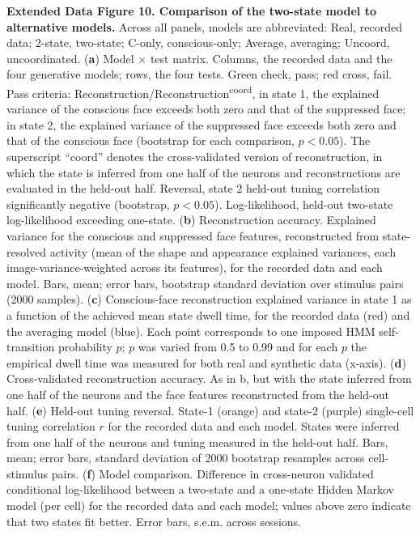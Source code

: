 \documentclass{article}
\begin{document}
\noindent\textbf{Extended Data Figure 10. Comparison of the two-state model to alternative models.} Across all panels, models are abbreviated: Real, recorded data; 2-state, two-state; C-only, conscious-only; Average, averaging; Uncoord, uncoordinated. (\textbf{a}) Model $\times$ test matrix. Columns, the recorded data and the four generative models; rows, the four tests. Green check, pass; red cross, fail. Pass criteria: Reconstruction/\allowbreak Reconstruction\textsuperscript{coord}, in state 1, the explained variance of the conscious face exceeds both zero and that of the suppressed face; in state 2, the explained variance of the suppressed face exceeds both zero and that of the conscious face (bootstrap for each comparison, $p < 0.05$). The superscript ``coord'' denotes the cross-validated version of reconstruction, in which the state is inferred from one half of the neurons and reconstructions are evaluated in the held-out half. Reversal, state 2 held-out tuning correlation significantly negative (bootstrap, $p < 0.05$). Log-likelihood, held-out two-state log-likelihood exceeding one-state. (\textbf{b}) Reconstruction accuracy. Explained variance for the conscious and suppressed face features, reconstructed from state-resolved activity (mean of the shape and appearance explained variances, each image-variance-weighted across its features), for the recorded data and each model. Bars, mean; error bars, bootstrap standard deviation over stimulus pairs (2000 samples). (\textbf{c}) Conscious-face reconstruction explained variance in state 1 as a function of the achieved mean state dwell time, for the recorded data (red) and the averaging model (blue). Each point corresponds to one imposed HMM self-transition probability $p$; $p$ was varied from 0.5 to 0.99 and for each $p$ the empirical dwell time was measured for both real and synthetic data (x-axis). (\textbf{d}) Cross-validated reconstruction accuracy. As in b, but with the state inferred from one half of the neurons and the face features reconstructed from the held-out half. (\textbf{e}) Held-out tuning reversal. State-1 (orange) and state-2 (purple) single-cell tuning correlation $r$ for the recorded data and each model. States were inferred from one half of the neurons and tuning measured in the held-out half. Bars, mean; error bars, standard deviation of 2000 bootstrap resamples across cell-stimulus pairs. (\textbf{f}) Model comparison. Difference in cross-neuron validated conditional log-likelihood between a two-state and a one-state Hidden Markov model (per cell) for the recorded data and each model; values above zero indicate that two states fit better. Error bars, s.e.m. across sessions.
\end{document}
